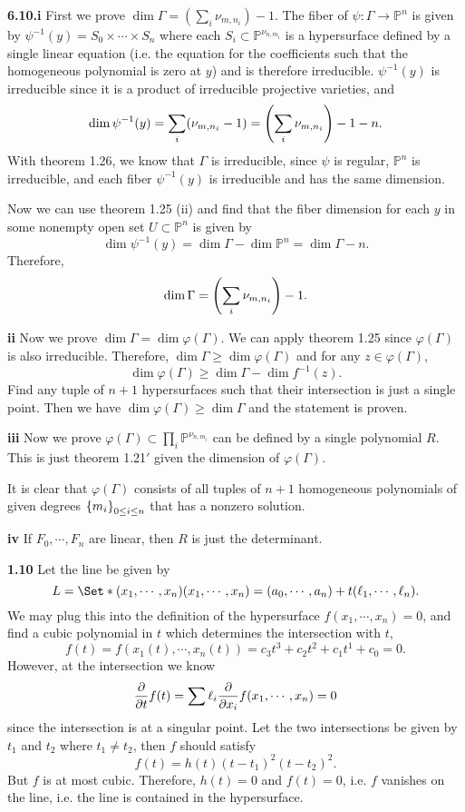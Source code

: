 \documentclass{article}
\makeatletter
\newcommand*{\shifttext}[1]{%
  \settowidth{\@tempdima}{#1}%
  \hspace{-\@tempdima}#1%
}
\newcommand{\plabel}[1]{%
\shifttext{\textbf{#1}\quad}%
}
\newcommand{\prule}{%
\begin{center}%
\hdashrule[0.5ex]{.99\linewidth}{1pt}{1pt 2.5pt}%
\end{center}%
}
\makeatother
\begin{document}
\plabel{6.10.i}%
First we prove $\dim \Gamma = (\sum_i \nu_{m,n_i}) - 1$.
The fiber of $\psi\colon\Gamma\to\mathbb{P}^n$ is given by $\psi^{-1}(y) = S_0 \times \cdots \times S_n$ where each $S_i \subset \mathbb{P}^{\nu_{n,m_i}}$ is a hypersurface defined by a single linear equation (i.e. the equation for the coefficients such that the homogeneous polynomial is zero at $y$) and is therefore irreducible.
$\psi^{-1}(y)$ is irreducible since it is a product of irreducible projective varieties, and
\[ \dim \psi^{-1}(y) = \sum_{i} (\nu_{m,n_i} - 1) = \qty(\sum_i \nu_{m,n_i}) - 1 - n. \]
With theorem 1.26, we know that $\Gamma$ is irreducible, since $\psi$ is regular, $\mathbb{P}^n$ is irreducible, and each fiber $\psi^{-1}(y)$ is irreducible and has the same dimension.
\par
Now we can use theorem 1.25 (ii) and find that the fiber dimension for each $y$ in some nonempty open set $U\subset \mathbb{P}^n$ is given by
\[ \dim \psi^{-1}(y) = \dim \Gamma - \dim \mathbb{P}^n = \dim \Gamma - n. \]
Therefore,
\[ \dim\Gamma = \qty(\sum_i \nu_{m,n_i}) - 1. \]

\plabel{ii}%
Now we prove $\dim \Gamma = \dim \varphi(\Gamma)$.
We can apply theorem 1.25 since $\varphi(\Gamma)$ is also irreducible.
Therefore, $\dim \Gamma \ge \dim \varphi(\Gamma)$ and for any $z\in \varphi(\Gamma)$,
\[ \dim \varphi(\Gamma) \ge \dim \Gamma - \dim f^{-1}(z). \]
Find any tuple of $n+1$ hypersurfaces such that their intersection is just a single point.
Then we have $\dim\varphi(\Gamma) \ge \dim\Gamma$ and the statement is proven.

\plabel{iii}%
Now we prove $\varphi(\Gamma) \subset \prod_i \mathbb{P}^{\nu_{n,m_i}}$ can be defined by a single polynomial $R$.
This is just theorem 1.21$'$ given the dimension of $\varphi(\Gamma)$.
\par
It is clear that $\varphi(\Gamma)$ consists of all tuples of $n+1$ homogeneous polynomials of given degrees $\qty{m_i}_{0\le i\le n}$ that has a nonzero solution.

\plabel{iv}%
If $F_0,\cdots,F_n$ are linear, then $R$ is just the determinant.

\prule

\plabel{1.10}%
Let the line be given by
\[ L = \Set*{(x_1,\cdots,x_n)}{(x_1,\cdots,x_n) = (a_0,\cdots,a_n) + t (\ell_1,\cdots,\ell_n)}. \]
We may plug this into the definition of the hypersurface $f(x_1,\cdots,x_n) = 0$, and find a cubic polynomial in $t$ which determines the intersection with $t$,
\[ f(t) = f(x_1(t),\cdots,x_n(t)) =  c_3 t^3 + c_2 t^2 + c_1 t^1 + c_0 = 0. \]
However, at the intersection we know
\[ \pdv{t} f(t) = \sum \ell_i \pdv{x_i} f(x_1,\cdots,x_n) = 0 \]
since the intersection is at a singular point.
Let the two intersections be given by $t_1$ and $t_2$ where $t_1\neq t_2$, then $f$ should satisfy
\[ f(t) = h(t) (t-t_1)^2(t-t_2)^2. \]
But $f$ is at most cubic.
Therefore, $h(t)=0$ and $f(t)=0$, i.e. $f$ vanishes on the line, i.e. the line is contained in the hypersurface.
\end{document}
